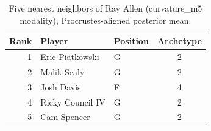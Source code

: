 \begin{table}[htbp]
  \centering\small
  \begin{tabular}{rllc}
    \toprule
    Rank & Player & Position & Archetype \\
    \midrule
    1 & Eric Piatkowski & G & 2 \\
    2 & Malik Sealy & G & 2 \\
    3 & Josh Davis & F & 4 \\
    4 & Ricky Council IV & G & 2 \\
    5 & Cam Spencer & G & 2 \\
    \bottomrule
  \end{tabular}
  \caption{Five nearest neighbors of Ray Allen (curvature_m5 modality), Procrustes-aligned posterior mean.}
  \label{tab:Ray_Allen_neighbors_curvature_m5}
\end{table}

